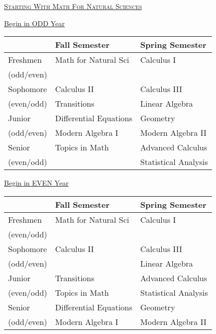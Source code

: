 \documentclass[letterpaper,10pt]{article}
\begin{document}
\vspace{0.4in}

\begin{center}
\underline{\scshape  \Large Starting With Math For Natural Sciences}
\end{center}

\begin{minipage}[b]{.45\textwidth}
\begin{center}\large  \underline{Begin in {\color{red} ODD} Year}
\end{center}
\begin{tabular}{l|l|l}
	&{\bf Fall Semester} & {\bf Spring Semester}\\
\hline
Freshmen & Math for Natural Sci & Calculus I \\
\scriptsize (odd/even) & & \\
\hline
Sophomore & Calculus II & Calculus III\\
\scriptsize (even/odd) & Transitions & Linear Algebra\\
\hline
Junior & Differential Equations & Geometry \\
\scriptsize (odd/even)& Modern Algebra I & Modern Algebra II\\
\hline
Senior & {\color{gray}Topics in Math} &  Advanced Calculus \\
\scriptsize (even/odd)& & Statistical Analysis
\end{tabular} 
\end{minipage}
\hspace{4em}
\begin{minipage}[b]{.45\textwidth}
\begin{center}\large  \underline{Begin in {\color{red} EVEN} Year}
\end{center}
\begin{tabular}{l|l|l}
	&{\bf Fall Semester} & {\bf Spring Semester}\\
\hline
Freshmen & Math for Natural Sci & Calculus I \\
\scriptsize (even/odd) & & \\
\hline
Sophomore & Calculus II & Calculus III\\
\scriptsize (odd/even)&  & Linear Algebra\\
\hline
Junior & Transitions & Advanced Calculus \\
\scriptsize (even/odd)& {\color{gray} Topics in Math} & Statistical Analysis\\
 \hline
Senior & Differential Equations & Geometry\\
\scriptsize (odd/even)& Modern Algebra I & Modern Algebra II\\
\end{tabular}
\end{minipage}
\end{document}

